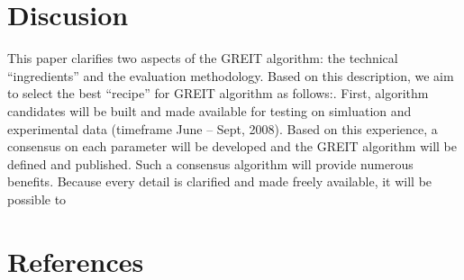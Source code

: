 \documentclass[letterpaper,twocolumn,11pt]{article}
\begin{document}
\section{Discusion}

This paper clarifies two aspects of the
GREIT algorithm: the technical ``ingredients''
and the evaluation methodology. Based on
this description, we aim to select the best
``recipe'' for GREIT algorithm as follows:. 
First, algorithm candidates will be
built and made available for testing on
simluation and experimental data
(timeframe June -- Sept, 2008). 
Based on this experience, a consensus
on each parameter will be developed
and the GREIT algorithm will be
defined and published.
Such a consensus algorithm will provide
numerous benefits. Because every detail
is clarified and made freely available, it
will be possible to 


\section*{References}
\end{document}
